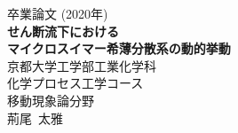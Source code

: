 \documentclass[12pt, a4j, dvipdfmx]{jarticle}
\begin{document}
\begin{titlepage}
    \begin{center}
        \vspace*{50truept}
        {\huge 卒業論文 (2020年)} \\
        \vspace*{100truept}
        {\huge \textbf{せん断流下における\\マイクロスイマー希薄分散系の動的挙動}} \\
        \vspace{120truept}
        {\LARGE 京都大学工学部工業化学科} \\
        {\LARGE 化学プロセス工学コース} \\
        {\LARGE 移動現象論分野} \\
        \vspace{50truept}
        {\LARGE 荊尾\ 太雅} \\
        \vspace{50truept}
    \end{center}
\end{titlepage}
\end{document}
